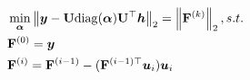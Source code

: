\documentclass{article} %
\def\valpha{{\bm\alpha}}
\begin{document}
	
	
	
	\begin{equation}
		\label{equ:trans_bound1}
		\begin{aligned}
			&\min_{\valpha}\left\|\vy-\rmU\mathrm{diag}(\valpha)\rmU^{\top}\vh\right\|_2=\left\|\rmF^{(k)}\right\|_2,s.t.\\
			&\rmF^{(0)}=\vy\\
			&\rmF^{(i)}=\rmF^{(i-1)}-(\rmF^{(i-1)\top}\vu_i)\vu_i
		\end{aligned}
	\end{equation}
	
\end{document}
